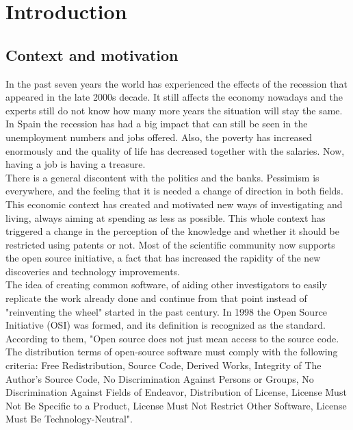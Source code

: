 \chapter{Introduction}

\section{Context and motivation}
In the past seven years the world has experienced the effects of the recession that appeared in the late 2000s decade. It still affects the economy nowadays and the experts still do not know how many more years the situation will stay the same. \\

In Spain the recession has had a big impact that can still be seen in the unemployment numbers and jobs offered. Also, the poverty has increased enormously and the quality of life has decreased together with the salaries. Now, having a job is having a treasure. 
\\

There is a general discontent with the politics and the banks. Pessimism is everywhere, and the feeling that it is needed a change of direction in both fields. 
\\

This economic context has created and motivated new ways of investigating and living, always aiming at spending as less as possible. This whole context has triggered a change in the perception of the knowledge and whether it should be restricted using patents or not. Most of the scientific community now supports the open source initiative, a fact that has increased the rapidity of the new discoveries and technology improvements. 
\\

The idea of creating common software, of aiding other investigators to easily replicate the work already done and continue from that point instead of "reinventing the wheel" started in the past century. In 1998 the Open Source Initiative (OSI)\cite{osi} was formed, and its definition is recognized as the standard. According to them, "Open source does not just mean access to the source code. The distribution terms of open-source software must comply with the following criteria: Free Redistribution, Source Code, Derived Works, Integrity of The Author's Source Code, No Discrimination Against Persons or Groups, No Discrimination Against Fields of Endeavor, Distribution of License, License Must Not Be Specific to a Product, License Must Not Restrict Other Software,  License Must Be Technology-Neutral"\cite{osi_def}. 
\\

